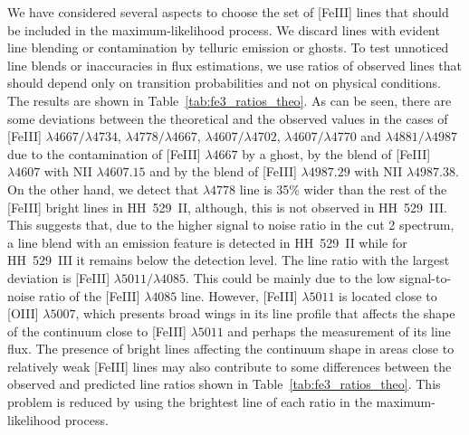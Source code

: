 \documentclass[fleqn,usenatbib]{mnras}
\begin{document}
We have considered several aspects to choose the set of [Fe\thinspace III] lines that should be included in the maximum-likelihood process. We discard lines with evident line blending or contamination by telluric emission or ghosts. To test unnoticed line blends or inaccuracies in flux estimations, we use ratios of observed lines that should depend only on transition probabilities and not on physical conditions. The results are shown in Table~\ref{tab:fe3_ratios_theo}. As can be seen, there are some deviations between the theoretical and the observed values in the cases of [Fe\thinspace III] $\lambda 4667/\lambda 4734$, $\lambda 4778/\lambda 4667$, $\lambda 4607/\lambda 4702$, $\lambda 4607/\lambda 4770$ and $\lambda 4881/\lambda 4987$ due to the contamination of [Fe\thinspace III] $\lambda 4667$ by a ghost, by the blend of [Fe\thinspace III] $\lambda 4607$ with N\thinspace II $\lambda 4607.15$ and by the blend of [Fe\thinspace III] $\lambda 4987.29$ with N\thinspace II $\lambda 4987.38$. On the other hand, we detect that $\lambda 4778$ line is 35\% wider than the rest of the [Fe\thinspace III] bright lines in HH~529~II, although, this is not observed in HH~529~III. This suggests that, due to the higher signal to noise ratio in the cut 2 spectrum, a line blend with an emission feature is detected in HH~529~II while for HH~529~III it remains below the detection level. The line ratio with the largest deviation is [Fe\thinspace III] $\lambda 5011/\lambda 4085$. This could be mainly due to the low signal-to-noise ratio of the [Fe\thinspace III] $\lambda 4085$ line. However, [Fe\thinspace III] $\lambda 5011$ is located close to [O\thinspace III] $\lambda 5007$, which presents broad wings in its line profile that affects the shape of the continuum close to  [Fe\thinspace III] $\lambda 5011$ and perhaps the measurement of its line flux. The presence of bright lines affecting the continuum shape in areas close to relatively weak [Fe\thinspace III] lines may also contribute to some differences between the observed and predicted line ratios shown in Table~\ref{tab:fe3_ratios_theo}. This problem is reduced by using the brightest line of each ratio in the maximum-likelihood process.
\end{document}
